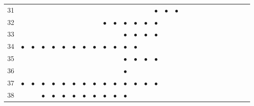 \documentclass[text.tex]{subfiles}
\begin{document}
\begin{table}
{\begin{tabular}{l|cccccccccccccccccccccccccc}
31  &           &           &           &           &           &           &           &           &           &           &           &           &           & $\bullet$ & $\bullet$ & $\bullet$ &           &           &           &           &           &           &           &           &           \\
32  &           &           &           &           &           &           &           &           & $\bullet$ & $\bullet$ & $\bullet$ & $\bullet$ & $\bullet$ & $\bullet$ &           &           &           &           &           &           &           &           &           &           &           \\
33  &           &           &           &           &           &           &           &           &           &           & $\bullet$ & $\bullet$ & $\bullet$ & $\bullet$ &           &           &           &           &           &           &           &           &           &           &           \\
34  & $\bullet$ & $\bullet$ & $\bullet$ & $\bullet$ & $\bullet$ & $\bullet$ & $\bullet$ & $\bullet$ & $\bullet$ & $\bullet$ & $\bullet$ & $\bullet$ &           &           &           &           &           &           &           &           &           &           &           &           &           \\
35  &           &           &           &           &           &           &           &           &           &           & $\bullet$ & $\bullet$ & $\bullet$ & $\bullet$ &           &           &           &           &           &           &           &           &           &           &           \\
36  &           &           &           &           &           &           &           &           &           &           & $\bullet$ &           &           &           &           &           &           &           &           &           &           &           &           &           &           \\
37  & $\bullet$ & $\bullet$ & $\bullet$ & $\bullet$ & $\bullet$ & $\bullet$ & $\bullet$ & $\bullet$ & $\bullet$ & $\bullet$ & $\bullet$ & $\bullet$ & $\bullet$ & $\bullet$ &           &           &           &           &           &           &           &           &           &           &           \\
38  &           &           & $\bullet$ & $\bullet$ & $\bullet$ & $\bullet$ & $\bullet$ & $\bullet$ & $\bullet$ & $\bullet$ & $\bullet$ &           &           &           &           &           &           &           &           &           &           &           &           &           &           \\

\end{tabular}}
\end{table}
\end{document}
